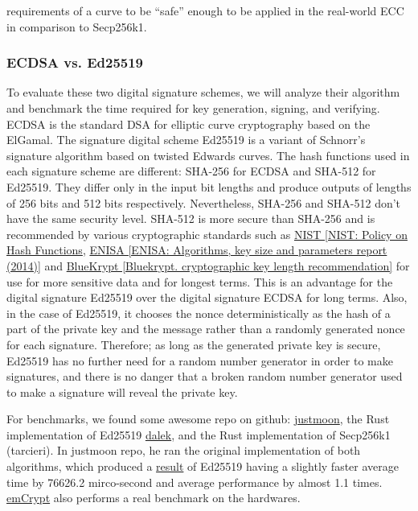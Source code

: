 requirements of a curve to be “safe” enough to be applied in the real-world ECC in comparison to Secp256k1.\\

\subsubsection{ECDSA vs. Ed25519}

To evaluate these two digital signature schemes, we will analyze their algorithm and benchmark the time required for key generation, signing, and verifying. ECDSA is the standard DSA for elliptic curve cryptography based on the ElGamal. The signature digital scheme Ed25519 is a variant of Schnorr’s signature algorithm based on twisted Edwards curves. The hash functions used in each signature scheme are different: SHA-256 for ECDSA and SHA-512 for Ed25519. They differ only in the input bit lengths and produce outputs of lengths of 256 bits and 512 bits respectively. Nevertheless, SHA-256 and SHA-512 don’t have the same security level. SHA-512 is more secure than SHA-256 and is recommended by various cryptographic standards such as \href{https://csrc.nist.gov/projects/hash-functions/nist-policy-on-hash-functions}{NIST [NIST: Policy on Hash Functions}, \href{https://www.enisa.europa.eu/publications}{ENISA [ENISA: Algorithms, key size and parameters report (2014)]} and \href{https://www.keylength.com/en/}{BlueKrypt [Bluekrypt. cryptographic key length recommendation]} for use for more sensitive data and for longest terms. This is an advantage for the digital signature Ed25519 over the digital signature ECDSA for long terms. Also, in the case of Ed25519, it chooses the nonce deterministically as the hash of a part of the private key and the message rather than a randomly generated nonce for each signature. Therefore; as long as the generated private key is secure, Ed25519 has no further need for a random number generator in order to make signatures, and there is no danger that a broken random number generator used to make a signature will reveal the private key.\\

\vspace{0.5cm}

For benchmarks, we found some awesome repo on github: \href{https://github.com/justmoon/curvebench}{justmoon}, the Rust implementation of Ed25519 \href{https://github.com/dalek-cryptography/ed25519-dalek}{dalek}, and the Rust implementation of Secp256k1 (tarcieri). In justmoon repo, he ran the original implementation of both algorithms, which produced a \href{http://justmoon.github.io/curvebench/benchmark.html}{result} of Ed25519 having a slightly faster average time by 76626.2 mirco-second and average performance by almost 1.1 times. \href{https://wiki.segger.com/emCrypt}{emCrypt} also performs a real benchmark on the hardwares.\\



